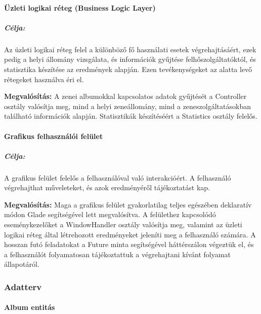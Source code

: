 
\paragraph{Üzleti logikai réteg (Business Logic Layer)}
\label{par:bll}

\subparagraph{Célja:} Az üzleti logikai réteg felel a különböző fő használati esetek végrehajtásáért, ezek pedig a helyi állomány vizsgálata, és információk gyűjtése felhőszolgáltatóktól, és statisztika készítése az eredmények alapján. Ezen tevékenységeket az alatta levő rétegeket használva éri el.

\textbf{Megvalósítás:}
A zenei albumokkal kapcsolatos adatok gyűjtését a Controller osztály valósítja meg, mind a helyi zeneállomány, mind a zeneszolgáltatásokban található információk alapján. Statisztikák készítéséért a Statistics osztály felelős.


\paragraph{Grafikus felhasználói felület}
\label{par:gui}

\subparagraph{Célja:}
A grafikus felület felelős a felhasználóval való interakcióért. A felhasználó végrehajthat műveleteket, és azok eredményéről tájékoztatást kap.

\textbf{Megvalósítás:}
Maga a grafikus felület gyakorlatilag teljes egészében deklaratív módon Glade segítségével lett megvalósítva. A felülethez kapcsolódó eseménykezelőket a WindowHandler osztály valósítja meg, valamint az üzleti logikai réteg által létrehozott eredményeket jeleníti meg a felhasználó számára.
A hosszan futó feladatokat a Future minta segítségével háttérszálon végeztük el, és a felhasználót folyamatosan tájékoztattuk a végrehajtani kívánt folyamat állapotáról.



\subsubsection{Adatterv}
\label{ssub:adatterv}

\paragraph{Album entitás}
\label{par:album}

